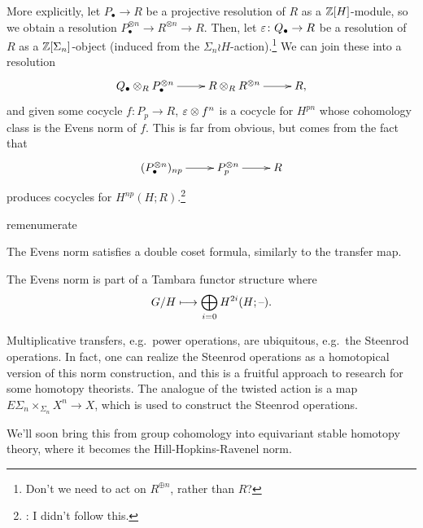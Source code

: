 More explicitly, let $P_\bullet\to R$ be a projective resolution of $R$ as a $\mathbb Z[H]$-module, so we obtain a
resolution $P_\bullet^{\otimes n}\to R^{\otimes n}\to R$. Then, let $\varepsilon\colon Q_\bullet\to R$ be a resolution of
$R$ as a $\mathbb Z[\Sigma_n]$-object (induced from the $\Sigma_n\wr H$-action).\footnote{Don't we need to act on
$R^{\oplus n}$, rather than $R$?} We can join these into a resolution
\[\xymatrix{
	Q_\bullet\otimes_R P_\bullet^{\otimes n}\ar[r] & R\otimes_R R^{\otimes n}\ar[r] & R,
}\]
and given some cocycle $f\colon P_p\to R$, $\varepsilon\otimes f^n$ is a cocycle for $H^{pn}$ whose cohomology class is the
Evens norm of $f$. This is far from obvious, but comes from the fact that
\[\xymatrix{
	(P_\bullet^{\otimes n})_{np}\ar[r] & P_p^{\otimes n}\ar[r] & R
}\]
produces cocycles for $H^{np}(H;R)$.\footnote{\TODO: I didn't follow this.}
\begin{comp}{rem}{enumerate}
	\item The Evens norm satisfies a double coset formula, similarly to the transfer map.
	\item The Evens norm is part of a Tambara functor structure where
	\[G/H\mapsto \bigoplus_{i=0} H^{2i}(H; \bl).\]
	\item Multiplicative transfers, e.g.\ power operations, are ubiquitous, e.g.\ the Steenrod operations. In fact,
	one can realize the Steenrod operations as a homotopical version of this norm construction, and this is a
	fruitful approach to research for some homotopy theorists. The analogue of the twisted action is a map
	$E\Sigma_n\times_{\Sigma_n} X^n\to X$, which is used to construct the Steenrod operations. \qedhere
\end{comp}
We'll soon bring this from group cohomology into equivariant stable homotopy theory, where it becomes the
Hill-Hopkins-Ravenel norm.

